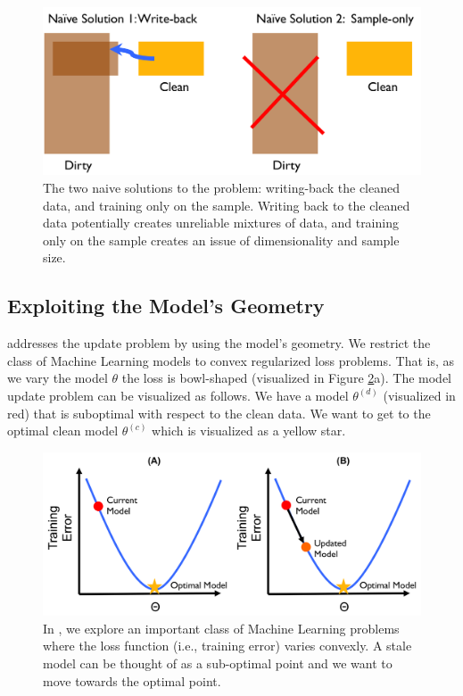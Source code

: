 \begin{figure}[ht!]
\centering
 \includegraphics[width=\columnwidth]{figs/update-arch.png}
 \caption{The two naive solutions to the problem: writing-back the cleaned data, and training only on the sample. Writing back to the cleaned data potentially creates unreliable mixtures of data, and training only on the sample creates an issue of dimensionality and sample size. \label{update-arch1}}
\end{figure}

\subsection{Exploiting the Model's Geometry}
\sys addresses the update problem by using the model's geometry.
We restrict the class of Machine Learning models to convex regularized loss problems.
That is, as we vary the model $\theta$ the loss is bowl-shaped (visualized in Figure \ref{update-arch2}a).
The model update problem can be visualized as follows.
We have a model $\theta^{(d)}$ (visualized in red) that is suboptimal with respect to the clean data.
We want to get to the optimal clean model $\theta^{(c)}$ which is visualized as a yellow star.

\begin{figure}[ht!]
\centering
 \includegraphics[width=\columnwidth]{figs/update-arch2.png}
 \caption{In \sys, we explore an important class of Machine Learning problems where the loss function (i.e., training error) varies convexly. A stale model can be thought of as a sub-optimal point and we want to move towards the optimal point. \label{update-arch2}}
\end{figure}

